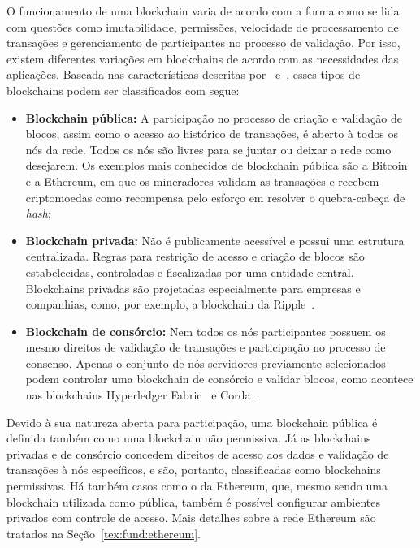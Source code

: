 
O funcionamento de uma blockchain varia de acordo com a forma como se lida com questões como imutabilidade, permissões, velocidade de processamento de transações  e gerenciamento de participantes no processo de validação. Por isso, existem diferentes variações em blockchains de acordo com as necessidades das aplicações. Baseada nas características descritas por~ e~, esses tipos de blockchains podem ser classificados com segue:

\begin{itemize}
    \item \textbf{Blockchain pública:} A participação no processo de criação e validação de blocos, assim como o acesso ao histórico de transações, é aberto à todos os nós da rede. Todos os nós são livres para se juntar ou deixar a rede como desejarem. Os exemplos mais conhecidos de blockchain pública são a Bitcoin e a Ethereum, em que os mineradores validam as transações e recebem criptomoedas como recompensa pelo esforço em resolver o quebra-cabeça de \textit{hash};
    \item \textbf{Blockchain privada:} Não é publicamente acessível e possui uma estrutura centralizada. Regras para restrição de acesso e criação de blocos são estabelecidas, controladas e fiscalizadas por uma entidade central. Blockchains privadas são projetadas especialmente para empresas e companhias, como, por exemplo, a blockchain da Ripple~\cite{overview-schwartz2014ripple}. 
    \item \textbf{Blockchain de consórcio:} Nem todos os nós participantes possuem os mesmo direitos de validação de transações e participação no processo de consenso. Apenas o conjunto de nós servidores previamente selecionados podem controlar uma blockchain de consórcio e validar blocos, como acontece nas blockchains Hyperledger Fabric~\cite{overview-hyperledger2018androulaki} e Corda~\cite{brown2016corda}. 
\end{itemize}

Devido à sua natureza aberta para participação, uma blockchain pública é definida também como uma blockchain não permissiva. Já as blockchains privadas e de consórcio concedem direitos de acesso aos dados e validação de transações à nós específicos, e são, portanto, classificadas como blockchains permissivas. Há também casos como o da Ethereum, que, mesmo sendo uma blockchain utilizada como pública, também é possível configurar ambientes privados com controle de acesso. Mais detalhes sobre a rede Ethereum são tratados na Seção~\ref{tex:fund:ethereum}.